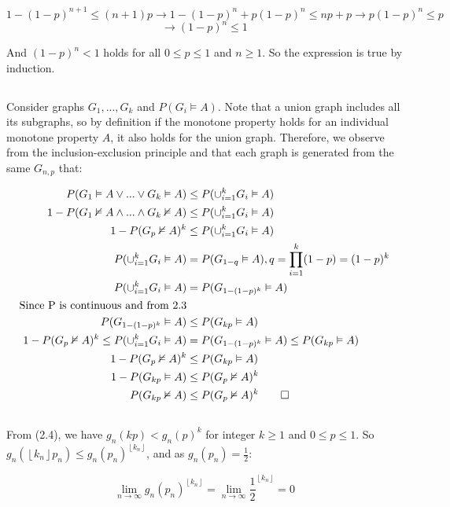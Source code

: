 \documentclass{article}
\begin{document}
$$1-(1-p)^{n+1} \le (n+1)p \rightarrow 1 - (1-p)^n + p(1-p)^n \le np + p \rightarrow p(1-p)^n \le p $$ 
$$\rightarrow (1-p)^n \le 1$$

And $(1-p)^n < 1$ holds for all $0 \le p \le 1$ and $n \ge 1$. So the expression is true by induction.

\subsection{}
Consider graphs $G_1,...,G_k$ and $P(G_i\vDash A)$. Note that a union graph includes all its subgraphs, so by definition if the monotone property holds for an individual monotone property $A$, it also holds for the union graph. Therefore, we observe from the inclusion-exclusion principle and that each graph is generated from the same $G_{n,p}$ that:

\begin{align*}
P(G_1\vDash A \vee ... \vee G_k\vDash A)&\le P(\cup_{i=1}^k G_i\vDash A)\\
1-P(G_1\nvDash A \wedge ... \wedge G_k\nvDash A)&\le P(\cup_{i=1}^k G_i\vDash A)\\
1-P(G_p\nvDash A)^k&\le P(\cup_{i=1}^k G_i\vDash A)\\
P(\cup_{i=1}^kG_i\vDash A)&=P(G_{1-q}\vDash A), q=\prod_{i=1}^k(1-p)=(1-p)^k\\
P(\cup_{i=1}^kG_i\vDash A)&=P(G_{1-(1-p)^k}\vDash A)\\
\text{Since P is continuous and from 2.3}\\
P(G_{1-(1-p)^k}\vDash A)&\le P(G_{kp}\vDash A)\\
1-P(G_p\nvDash A)^k\le P(\cup_{i=1}^k G_i\vDash A)&=P(G_{1-(1-p)^k}\vDash A)\le P(G_{kp}\vDash A)\\
1-P(G_p\nvDash A)^k&\le P(G_{kp}\vDash A)\\
1-P(G_{kp}\vDash A)&\le P(G_p\nvDash A)^k\\
P(G_{kp}\nvDash A)&\le P(G_p\nvDash A)^k\qed \\
\end{align*}

\subsection{}
From (2.4), we have $g_n(kp) < g_n(p)^k$ for integer $k \ge 1$ and $0 \le p \le 1$. So $g_n(\left \lfloor{k_n}\right \rfloor p_n) \le g_n(p_n)^{\left \lfloor{k_n}\right \rfloor}$, and as $g_n(p_n) = \frac{1}{2}$: 

$$\lim_{n\to\infty} g_n(p_n)^{\left \lfloor{k_n}\right \rfloor} = \lim_{n\to\infty} \frac{1}{2}^{\left \lfloor{k_n}\right \rfloor} = 0$$
\end{document}
